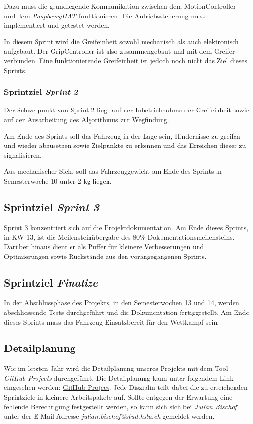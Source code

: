 \documentclass[main.tex]{subfiles} %
\begin{document}
Dazu muss die grundlegende Kommunikation zwischen dem MotionController und dem
\textit{RaspberryHAT} funktionieren. Die Antriebssteuerung muss implementiert
und getestet werden.

In diesem Sprint wird die Greifeinheit sowohl mechanisch als auch elektronisch
aufgebaut. Der GripController ist also zusammengebaut und mit dem Greifer
verbunden. Eine funktionierende Greifeinheit ist jedoch noch nicht das Ziel
dieses Sprints.

\subsubsection*{Sprintziel \textit{Sprint 2}}
Der Schwerpunkt von Sprint 2 liegt auf der Inbetriebnahme der Greifeinheit sowie
auf der Ausarbeitung des Algorithmus zur Wegfindung.

Am Ende des Sprints soll das Fahrzeug in der Lage sein, Hindernisse zu greifen
und wieder abzusetzen sowie Zielpunkte zu erkennen und das Erreichen dieser zu
signalisieren.

Aus mechanischer Sicht soll das Fahrzeuggewicht am Ende des Sprints in
Semesterwoche 10 unter 2 kg liegen.

\subsection*{Sprintziel \textit{Sprint 3}}
Sprint 3 konzentriert sich auf die Projektdokumentation. Am Ende dieses Sprints,
in KW 13, ist die Meilensteinübergabe des 80\% Dokumentationsmeilensteins. Darüber
hinaus dient er als Puffer für kleinere Verbesserungen und Optimierungen sowie
Rückstände aus den vorangegangenen Sprints.

\subsection*{Sprintziel \textit{Finalize}}
In der Abschlussphase des Projekts, in den Semesterwochen 13 und 14, werden
abschliessende Tests durchgeführt und die Dokumentation fertiggestellt. Am Ende
dieses Sprints muss das Fahrzeug Einsatzbereit für den Wettkampf sein.

\subsection{Detailplanung}
Wie im letzten Jahr wird die Detailplanung unseres Projekts mit dem Tool
\textit{GitHub-Projects} durchgeführt. Die Detailplanung kann unter folgendem
Link eingesehen werden:
\href{https://github.com/users/JulesBischof/projects/6/views/4}{GitHub-Project}.
Jede Disziplin teilt dabei die zu erreichenden Sprintziele in kleinere
Arbeitspakete auf. Sollte entgegen der Erwartung eine fehlende Berechtigung
festgestellt werden, so kann sich sich bei \textit{Julian Bischof} unter der
E-Mail-Adresse \textit{julian.bischof@stud.hslu.ch} gemeldet werden.
\end{document}

